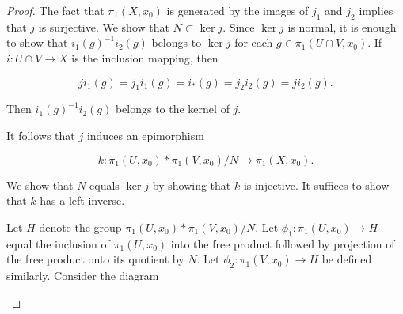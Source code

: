 \begin{proof}
The fact that \({\pi }_{1}( {X,x_{0}})\) is generated by the images of \(j_{1}\) and \(j_{2}\) implies that \(j\) is surjective.
We show that \(N \subset \ker j\). Since \(\ker j\) is normal, it is enough to show that \(i_{1}{( g) }^{-1}i_{2}( g)\) belongs to \(\ker j\) for each \(g \in {\pi }_{1}( {U \cap V,x_{0}})\). If \(i : U \cap V \rightarrow X\) is the inclusion mapping, then

\[
ji_{1}( g) = j_{1}i_{1}( g) = i_{ * }( g) = j_{2}i_{2}( g) = ji_{2}( g).
\]

Then \(i_{1}{( g) }^{-1}i_{2}( g)\) belongs to the kernel of \(j\).

It follows that \(j\) induces an epimorphism

\[
k : {\pi }_{1}( {U,x_{0}}) * {\pi }_{1}( {V,x_{0}}) /N \rightarrow {\pi }_{1}( {X,x_{0}}).
\]

We show that \(N\) equals \(\ker j\) by showing that \(k\) is injective. It suffices to show that \(k\) has a left inverse.

Let \(H\) denote the group \({\pi }_{1}( {U,x_{0}}) * {\pi }_{1}( {V,x_{0}}) /N\). Let \({\phi }_{1} : {\pi }_{1}( {U,x_{0}}) \rightarrow H\) equal the inclusion of \({\pi }_{1}( {U,x_{0}})\) into the free product followed by projection of the free product onto its quotient by \(N\). Let \({\phi }_{2} : {\pi }_{1}( {V,x_{0}}) \rightarrow H\) be defined similarly. Consider the diagram

\par\nopagebreak
\begin{center}
	\label{fig:com_70_01}
\end{center}
\par\nopagebreak 


\end{proof}

